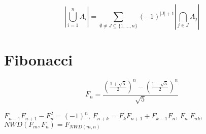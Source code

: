 $$| \bigcup_{i=1}^n A_i | = \sum_{\emptyset \neq J \subseteq  \{1,\dots,n\}} (-1)^{|J|+1} | \bigcap_{j \in J} A_j | $$

\section{Fibonacci}

$$F_n = \frac{\left(\frac{1+\sqrt{5}}{2}\right)^n - \left(\frac{1-\sqrt{5}}{2}\right)^n}{\sqrt{5}}$$

$F_{n-1}F_{n+1}-F_n^2=(-1)^n$, $F_{n+k}=F_k F_{n+1} + F_{k-1} F_n$, $F_n | F_{nk}$, $NWD(F_m, F_n) = F_{NWD(m, n)}$
